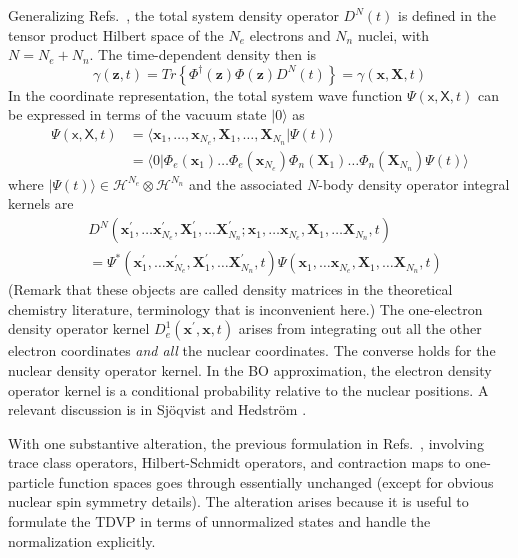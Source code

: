 \documentclass[aps,preprint]{revtex4}%
\begin{document}
Generalizing Refs.~, the total system density
operator $D^{N}(t)$ is defined in the tensor product Hilbert space of the
$N_{e}$ electrons and $N_{n}$ nuclei, with $N=N_{e}+N_{n}$. The time-dependent
density then is
\begin{equation}
\gamma(\mathbf{z},t)=Tr\left\{  \Phi^{\dagger}(\mathbf{z})\Phi(\mathbf{z}%
)D^{N}(t)\right\}  =\gamma(\mathbf{x},\mathbf{X},t)
\end{equation}
In the coordinate representation, the total system wave function
$\Psi(\mathsf{x},\mathsf{X},t)$ can be expressed in terms of the vacuum state
$|0\rangle$ as
\begin{align}
\Psi(\mathsf{x},\mathsf{X},t)  &  =\langle\mathbf{x}_{1},\ldots,\mathbf{x}%
_{N_{e}},\mathbf{X}_{1},\ldots,\mathbf{X}_{N_{n}}|\Psi(t)\rangle\nonumber\\
&  =\langle0|\Phi_{e}(\mathbf{x}_{1})\ldots\Phi_{e}(\mathbf{x}_{N_{e}}%
)\Phi_{n}(\mathbf{X}_{1})\ldots\Phi_{n}(\mathbf{X}_{N_{n}})\Psi(t)\rangle
\end{align}
where $|\Psi(t)\rangle\in\mathcal{H}^{N_{e}}\otimes\mathcal{H}^{N_{n}}$ and
the associated $N$-body density operator integral kernels are
\begin{align}
&  D^{N}(\mathbf{x}_{1}^{\prime},\ldots\mathbf{x}_{N_{e}}^{\prime}%
,\mathbf{X}_{1}^{\prime},\ldots\mathbf{X}_{N_{n}}^{\prime};\mathbf{x}%
_{1},\ldots\mathbf{x}_{N_{e}},\mathbf{X}_{1},\ldots\mathbf{X}_{N_{n}%
},t)\nonumber\\
&  =\Psi^{\ast}(\mathbf{x}_{1}^{\prime},\ldots\mathbf{x}_{N_{e}}^{\prime
},\mathbf{X}_{1}^{\prime},\ldots\mathbf{X}_{N_{n}}^{\prime},t)\Psi
(\mathbf{x}_{1},\ldots\mathbf{x}_{N_{e}},\mathbf{X}_{1},\ldots\mathbf{X}%
_{N_{n}},t)
\end{align}
(Remark that these objects are called density matrices in the theoretical
chemistry literature, terminology that is inconvenient here.) The one-electron
density operator kernel $D_{e}^{1}(\mathbf{x}^{\prime},\mathbf{x},t)$ arises
from integrating out all the other electron coordinates \emph{and all} the
nuclear coordinates. The converse holds for the nuclear density operator
kernel. In the BO approximation, the electron density operator kernel is a
conditional probability relative to the nuclear positions. A relevant
discussion is in Sj\"{o}qvist and Hedstr\"{o}m \cite{Sjoqvist}.

With one substantive alteration, the previous formulation in
Refs.~, involving trace class operators,
Hilbert-Schmidt operators, and contraction maps to one-particle function
spaces goes through essentially unchanged (except for obvious nuclear spin
symmetry details). The alteration arises because it is useful to formulate the
TDVP in terms of unnormalized states and handle the normalization explicitly.
\end{document}
